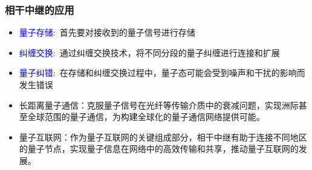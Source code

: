 \begin{frame}
    \frametitle{相干中继的应用}
    \begin{itemize}
	    \item \textcolor{blue}{量子存储}:~首先要对接收到的量子信号进行存储\\
		    {\fontsize{7.5pt}{5.2pt}\selectfont{利用量子存储器将量子态暂时保存下来，避免信号在传输过程中因损耗而丢失}}
	    \item \textcolor{blue}{纠缠交换}:~通过纠缠交换技术，将不同分段的量子纠缠进行连接和扩展\\
		    {\fontsize{7.5pt}{5.2pt}\selectfont{例如，将相邻两个中继节点之间的纠缠态延伸到更远的距离，使得量子信息能够跨越更长的距离进行传输}}
	    \item \textcolor{blue}{量子纠错}:~在存储和纠缠交换过程中，量子态可能会受到噪声和干扰的影响而发生错误\\
		    {\fontsize{7.5pt}{5.2pt}\selectfont{利用量子纠错编码对错误进行检测和纠正，确保量子态的准确性和相干性}}
    \end{itemize}
    \begin{itemize}
        \item 长距离量子通信：克服量子信号在光纤等传输介质中的衰减问题，实现洲际甚至全球范围的量子通信，为构建全球化的量子通信网络提供可能。
        \item 量子互联网：作为量子互联网的关键组成部分，相干中继有助于连接不同地区的量子节点，实现量子信息在网络中的高效传输和共享，推动量子互联网的发展。
    \end{itemize}
\end{frame}

